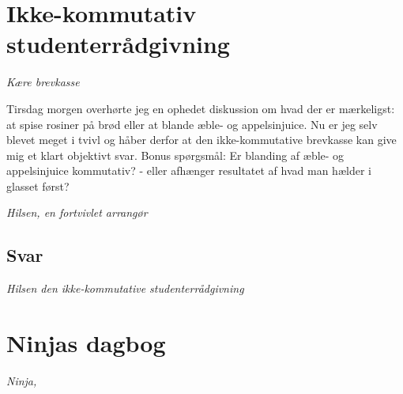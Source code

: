 \begin{minipage}[t]{100mm}
\vspace{3mm}
\section*{Ikke-kommutativ studenterrådgivning}
\emph{Kære brevkasse}

Tirsdag morgen overhørte jeg en ophedet diskussion om hvad der er mærkeligst: at spise rosiner på brød eller at blande æble- og appelsinjuice. Nu er jeg selv blevet meget i tvivl og håber derfor at den ikke-kommutative brevkasse kan give mig et klart objektivt svar. Bonus spørgsmål: Er blanding af æble- og appelsinjuice kommutativ? - eller afhænger resultatet af hvad man hælder i glasset først?
 
\emph{Hilsen, en fortvivlet arrangør}

\subsection*{Svar}

{\flushright\emph{Hilsen den ikke-kommutative studenterrådgivning}}


\section*{Ninjas dagbog}


{\flushright\emph{Ninja, }}


\end{minipage}

